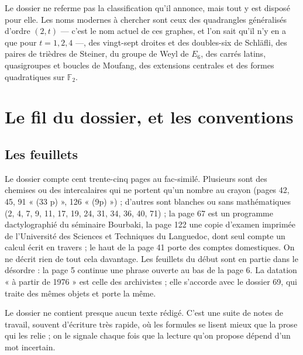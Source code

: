 \documentclass[11pt,a4paper]{article}
\begin{document}
\begin{resume}
Le dossier ne referme pas la classification qu'il annonce, mais tout y est
disposé pour elle. Les noms modernes à chercher sont ceux des quadrangles
généralisés d'ordre $(2, t)$ --- c'est le nom actuel de ces graphes, et l'on
sait qu'il n'y en a que pour $t = 1, 2, 4$ ---, des vingt-sept droites et des
doubles-six de Schläfli, des paires de trièdres de Steiner, du groupe de Weyl
de $E_6$, des carrés latins, quasigroupes et boucles de Moufang, des
extensions centrales et des formes quadratiques sur $\mathbb{F}_2$.

\end{resume}

\section*{Le fil du dossier, et les conventions}

\subsection*{Les feuillets}

Le dossier compte cent trente-cinq pages au fac-similé. Plusieurs sont des
chemises ou des intercalaires qui ne portent qu'un nombre au crayon (pages 42,
45, 91 « (33 p) », 126 « (9p) ») ; d'autres sont blanches ou sans
mathématiques (2, 4, 7, 9, 11, 17, 19, 24, 31, 34, 36, 40, 71) ; la page 67
est un programme dactylographié du séminaire Bourbaki, la page 122 une copie
d'examen imprimée de l'Université des Sciences et Techniques du Languedoc, dont
seul compte un calcul écrit en travers ; le haut de la page 41 porte des
comptes domestiques. On ne décrit rien de tout cela davantage. Les feuillets
du début sont en partie dans le désordre : la page 5 continue une phrase
ouverte au bas de la page 6. La datation « à partir de 1976 » est celle des
archivistes ; elle s'accorde avec le dossier 69, qui traite des mêmes objets
et porte la même.

Le dossier ne contient presque aucun texte rédigé. C'est une suite de notes de
travail, souvent d'écriture très rapide, où les formules se lisent mieux que
la prose qui les relie ; on le signale chaque fois que la lecture qu'on
propose dépend d'un mot incertain.
\end{document}
